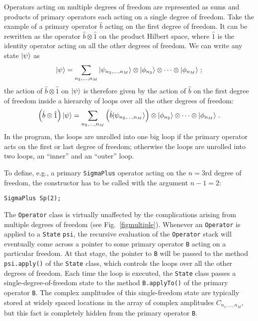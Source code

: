 Operators acting on multiple degrees of freedom are represented as sums and
products of primary operators each acting on a single degree of freedom.  Take
the example of a primary operator $\hat b$ acting on the first degree of
freedom. It can be rewritten as the operator $\hat b\otimes\hat1$ on the
product Hilbert space, where $\hat1$ is the identity operator acting
on all the other degrees of freedom. We can write any state $| \psi \rangle$ as
\begin{equation}
| \psi \rangle = \sum_{n_2,\ldots,n_M} |\psi_{n_2,\ldots,n_M}\rangle
  \otimes | \phi_{n_2} \rangle\otimes\cdots\otimes| \phi_{n_M} \rangle \;;
\end{equation}
the action of $\hat b\otimes\hat1$ on $| \psi \rangle$ is therefore given by the
action of $\hat b$ on the first degree of freedom inside a hierarchy of loops
over all the other degrees of freedom:
\begin{equation}
\left(\hat b\otimes{\hat 1}\right) | \psi \rangle =
  \sum_{n_2,\ldots,n_M} \left(\hat b|\psi_{n_2,\ldots,n_M}\rangle\right)
  \otimes | \phi_{n_2} \rangle\otimes\cdots\otimes| \phi_{n_M} \rangle \;.
\end{equation}
In the program, the loops are unrolled into one big loop if the primary
operator acts on the first or last degree of freedom; otherwise the loops are
unrolled into two loops, an ``inner'' and an ``outer'' loop.

To define, e.g., a primary {\tt SigmaPlus} operator acting on the $n=3$rd
degree of freedom, the constructor has to be called with the argument $n-1=2$:
\begin{verbatim}
SigmaPlus Sp(2);
\end{verbatim}

The {\tt Operator} class is virtually unaffected by the complications arising
from multiple degrees of freedom (see Fig.~\ref{figmultiple}).
Whenever an {\tt Operator} is applied to a
{\tt State} {\tt psi}, the recursive evaluation of the {\tt Operator} stack
will eventually come across a pointer to some primary operator {\tt B} acting
on a particular freedom. At that stage, the pointer to {\tt B} will be passed
to the method {\tt psi.apply()} of the {\tt State} class, which controls the
loops over all the other degrees of freedom. Each time the loop is executed,
the {\tt State} class passes a single-degree-of-freedom state to the method
{\tt B.applyTo()} of the primary operator {\tt B}. The complex amplitudes of
this single-freedom state are typically stored at widely spaced locations in
the array of complex amplitudes $C_{n_1,\ldots,n_M}$, but this fact is
completely hidden from the primary operator {\tt B}.

